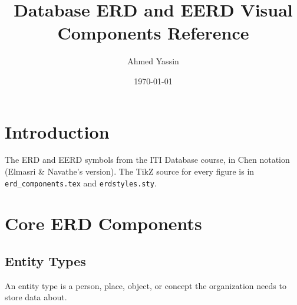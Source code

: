 \documentclass[a4paper,11pt]{article}
\title{\textbf{Database ERD and EERD Visual Components Reference}}
\author{Ahmed Yassin}
\date{\today}
\newenvironment{keepblock}
  {\par\noindent\begin{minipage}{\linewidth}\setlength{\parskip}{0.4em}}
  {\end{minipage}\par\bigskip}
\begin{document}
\maketitle

\begin{keepblock}
    \section{Introduction}
    The ERD and EERD symbols from the ITI Database course, in Chen notation (Elmasri \& Navathe's version). The TikZ source for every figure is in \texttt{erd\_components.tex} and \texttt{erdstyles.sty}.
\end{keepblock}

\begin{keepblock}
    \section{Core ERD Components}

    \subsection{Entity Types}
    An entity type is a person, place, object, or concept the organization needs to store data about.

    \begin{center}
        \centering
        \begin{minipage}{0.45\textwidth}
            \centering
        \end{minipage}
        \hfill
        \begin{minipage}{0.45\textwidth}
            \centering
        \end{minipage}
    \end{center}
\end{keepblock}
\end{document}
